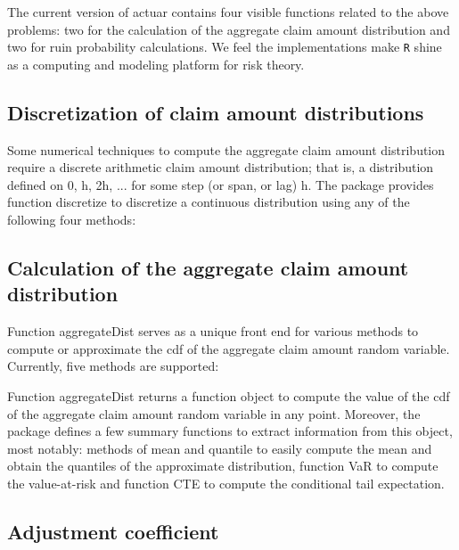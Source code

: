 \documentclass[12pt]{article}
\begin{document}
The current version of actuar contains four visible functions related to the above problems: two for the calculation of the aggregate claim amount distribution and two for ruin probability calculations. We feel the implementations make \texttt{R} shine as a computing and modeling platform for risk theory.

\subsection{Discretization of claim amount distributions}

Some numerical techniques to compute the aggregate claim amount distribution require a discrete arithmetic claim amount distribution; that is, a distribution defined on 0, h, 2h, ... for some step (or span, or lag) h. The package provides function discretize to discretize a continuous distribution using any of the following four methods:

\subsection{Calculation of the aggregate claim amount distribution}

Function aggregateDist serves as a unique front end for various methods to compute or approximate the cdf of the aggregate claim amount random variable. Currently, five methods are supported:

Function aggregateDist returns a function object to compute the value of the cdf of the aggregate claim amount random variable in any point. Moreover, the package defines a few summary functions to extract information from this object, most notably: methods of mean and quantile to easily compute the mean and obtain the quantiles of the approximate distribution, function VaR to compute the value-at-risk and function CTE to compute the conditional tail expectation.

\subsection{Adjustment coefficient}
\end{document}
